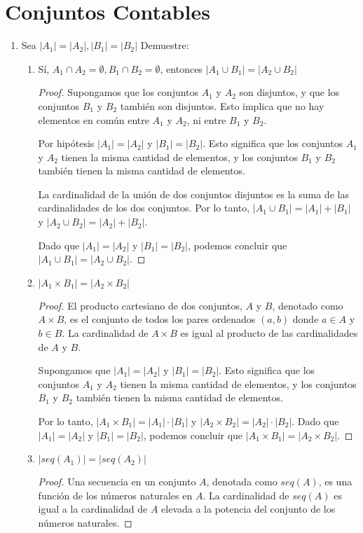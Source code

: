 \documentclass{article}
\begin{document}
\section{Conjuntos Contables}
\begin{enumerate}
  \item Sea $|A_1|=|A_2| , |B_1|=|B_2|$ Demuestre:
    \begin{enumerate}
      \item Sí, $A_1 \cap A_2 = \emptyset, B_1 \cap B_2 = \emptyset$, entonces $|A_1 \cup  B_1| = |A_2 \cup B_2|$
	\begin{proof}
	  Supongamos que los conjuntos $A_1$ y $A_2$ son disjuntos, y que los conjuntos $B_1$ y $B_2$ también son disjuntos. Esto implica que no hay elementos en común entre $A_1$ y $A_2$, ni entre $B_1$ y $B_2$.

	  Por hipótesis $|A_1| = |A_2|$ y $|B_1| = |B_2|$. Esto significa que los conjuntos $A_1$ y $A_2$ tienen la misma cantidad de elementos, y los conjuntos $B_1$ y $B_2$ también tienen la misma cantidad de elementos.

	  La cardinalidad de la unión de dos conjuntos disjuntos es la suma de las cardinalidades de los dos conjuntos. Por lo tanto, $|A_1 \cup B_1| = |A_1| + |B_1|$ y $|A_2 \cup B_2| = |A_2| + |B_2|$.

	  Dado que $|A_1| = |A_2|$ y $|B_1| = |B_2|$, podemos concluir que $|A_1 \cup B_1| = |A_2 \cup B_2|$.
	\end{proof}

      \item $|A_1 \times B_1| = |A_2 \times B_2|$
	\begin{proof}
	  El producto cartesiano de dos conjuntos, $A$ y $B$, denotado como $A \times B$, es el conjunto de todos los pares ordenados $(a, b)$ donde $a \in A$ y $b \in B$. La cardinalidad de $A \times B$ es igual al producto de las cardinalidades de $A$ y $B$.

	  Supongamos que $|A_1| = |A_2|$ y $|B_1| = |B_2|$. Esto significa que los conjuntos $A_1$ y $A_2$ tienen la misma cantidad de elementos, y los conjuntos $B_1$ y $B_2$ también tienen la misma cantidad de elementos.

	  Por lo tanto, $|A_1 \times B_1| = |A_1| \cdot |B_1|$ y $|A_2 \times B_2| = |A_2| \cdot |B_2|$. Dado que $|A_1| = |A_2|$ y $|B_1| = |B_2|$, podemos concluir que $|A_1 \times B_1| = |A_2 \times B_2|$.
	\end{proof}

      \item $|seq(A_1)| = |seq(A_2)|$
	\begin{proof}
	  Una secuencia en un conjunto $A$, denotada como $seq(A)$, es una función de los números naturales en $A$. La cardinalidad de $seq(A)$ es igual a la cardinalidad de $A$ elevada a la potencia del conjunto de los números naturales.


\end{proof}
\end{enumerate}
\end{enumerate}
\end{document}
